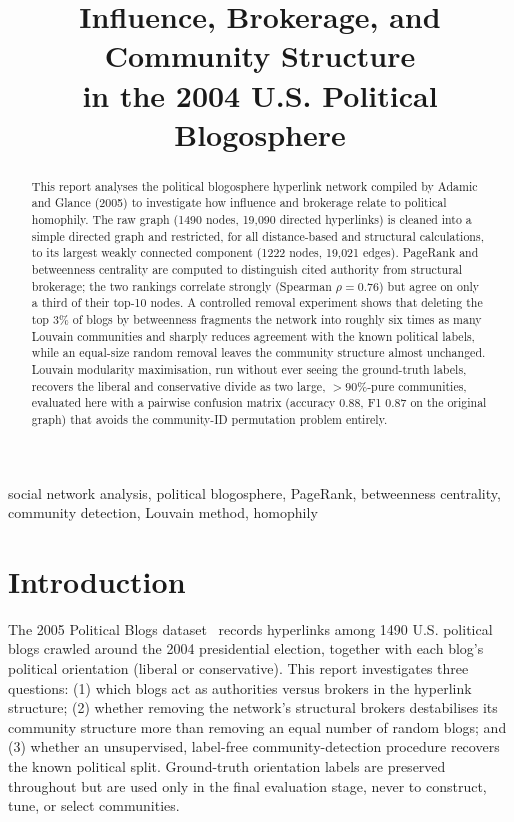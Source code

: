 \documentclass[10pt,conference]{IEEEtran}
\begin{document}
\title{Influence, Brokerage, and Community Structure\\ in the 2004 U.S. Political Blogosphere}

\author{
}

\maketitle

\begin{abstract}
This report analyses the political blogosphere hyperlink network compiled by Adamic and Glance
(2005) to investigate how influence and brokerage relate to political homophily. The raw graph
(1490 nodes, 19{,}090 directed hyperlinks) is cleaned into a simple directed graph and restricted,
for all distance-based and structural calculations, to its largest weakly connected component
(1222 nodes, 19{,}021 edges). PageRank and betweenness centrality are computed to distinguish
cited authority from structural brokerage; the two rankings correlate strongly (Spearman
$\rho=0.76$) but agree on only a third of their top-10 nodes. A controlled removal experiment
shows that deleting the top 3\% of blogs by betweenness fragments the network into roughly six
times as many Louvain communities and sharply reduces agreement with the known political labels,
while an equal-size random removal leaves the community structure almost unchanged. Louvain
modularity maximisation, run without ever seeing the ground-truth labels, recovers the liberal
and conservative divide as two large, $>90\%$-pure communities, evaluated here with a pairwise
confusion matrix (accuracy 0.88, F1 0.87 on the original graph) that avoids the community-ID
permutation problem entirely.
\end{abstract}

\begin{IEEEkeywords}
social network analysis, political blogosphere, PageRank, betweenness centrality, community detection, Louvain method, homophily
\end{IEEEkeywords}

\section{Introduction}
The 2005 Political Blogs dataset~\cite{adamic2005} records hyperlinks among 1490 U.S. political
blogs crawled around the 2004 presidential election, together with each blog's political
orientation (liberal or conservative). This report investigates three questions: (1) which blogs
act as authorities versus brokers in the hyperlink structure; (2) whether removing the network's
structural brokers destabilises its community structure more than removing an equal number of
random blogs; and (3) whether an unsupervised, label-free community-detection procedure recovers
the known political split. Ground-truth orientation labels are preserved throughout but are used
only in the final evaluation stage, never to construct, tune, or select communities.
\end{document}
